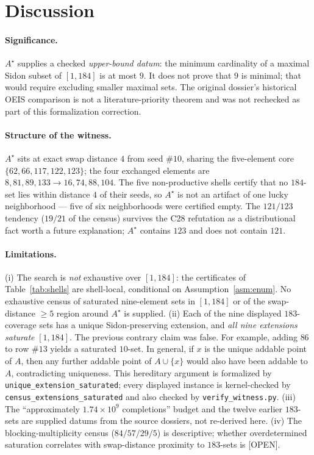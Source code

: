 \documentclass[11pt,a4paper]{article}
\theoremstyle{definition}
\begin{document}
\section{Discussion}

\paragraph{Significance.} $A^\star$ supplies a checked \emph{upper-bound
datum}: the minimum cardinality of a maximal Sidon subset of $[1,184]$
is at most $9$. It does not prove that $9$ is minimal; that would require
excluding smaller maximal sets. The original dossier's historical OEIS
comparison is not a literature-priority theorem and was not rechecked as
part of this formalization correction.

\paragraph{Structure of the witness.} $A^\star$ sits at exact swap
distance $4$ from seed $\#10$, sharing the five-element core
$\{62,66,117,122,123\}$; the four exchanged elements are
$8,81,89,133\to16,74,88,104$. The five non-productive shells certify
that no $184$-set lies within distance $4$ of their seeds, so $A^\star$
is not an artifact of one lucky neighborhood --- five of six
neighborhoods were certified empty. The $121/123$ tendency ($19/21$ of
the census) survives the C28 refutation as a distributional fact worth a
future explanation; $A^\star$ contains $123$ and does not contain $121$.

\paragraph{Limitations.} (i) The search is \emph{not} exhaustive over
$[1,184]$: the certificates of Table~\ref{tab:shells} are shell-local,
conditional on Assumption~\ref{asm:enum}. No exhaustive census of saturated
nine-element sets in $[1,184]$ or of the swap-distance $\ge5$ region around
$A^\star$ is supplied. (ii) Each of the nine displayed $183$-coverage sets has a
unique Sidon-preserving extension, and \emph{all nine extensions saturate}
$[1,184]$. The previous contrary claim was false. For example, adding
$86$ to row $\#13$ yields a saturated $10$-set. In general, if $x$ is the
unique addable point of $A$, then any further addable point of
$A\cup\{x\}$ would also have been addable to $A$, contradicting
uniqueness. This hereditary argument is formalized by
\texttt{unique\_extension\_saturated}; every displayed instance is
kernel-checked by \texttt{census\_extensions\_saturated} and also checked
by \texttt{verify\_witness.py}. (iii) The ``approximately
$1.74\times10^9$ completions'' budget and the twelve earlier $183$-sets
are supplied datums from the source dossiers, not re-derived here.
(iv) The blocking-multiplicity census ($84/57/29/5$) is descriptive;
whether overdetermined saturation correlates with swap-distance
proximity to $183$-sets is [OPEN].
\end{document}
